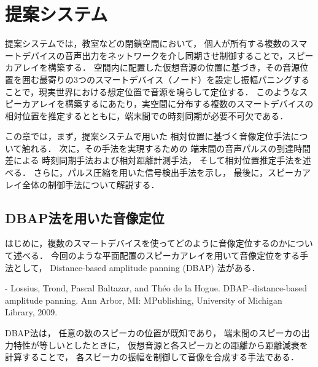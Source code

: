 
\chapter{提案システム}

提案システムでは，教室などの閉鎖空間において，
個人が所有する複数のスマートデバイスの音声出力をネットワークを介し同期させ制御することで，スピーカアレイを構築する．
空間内に配置した仮想音源の位置に基づき，その音源位置を囲む最寄りの3つのスマートデバイス（ノード）を設定し振幅パニングすることで，現実世界における想定位置で音源を鳴らして定位する．
このようなスピーカアレイを構築するにあたり，実空間に分布する複数のスマートデバイスの相対位置を推定するとともに，端末間での時刻同期が必要不可欠である．


この章では，まず，提案システムで用いた
相対位置に基づく音像定位手法について触れる．
次に，その手法を実現するための
端末間の音声パルスの到達時間差による
時刻同期手法および相対距離計測手法，
そして相対位置推定手法を述べる．
さらに，パルス圧縮を用いた信号検出手法を示し，
最後に，スピーカアレイ全体の制御手法について解説する．

\section{DBAP法を用いた音像定位}

はじめに，複数のスマートデバイスを使ってどのように音像定位するのかについて述べる．
今回のような平面配置のスピーカアレイを用いて音像定位をする手法として，
Distance-based amplitude panning (DBAP) 法がある．

- Lossius, Trond, Pascal Baltazar, and Théo de la Hogue. DBAP–distance-based amplitude panning. Ann Arbor, MI: MPublishing, University of Michigan Library, 2009.

DBAP法は，
任意の数のスピーカの位置が既知であり，
端末間のスピーカの出力特性が等しいとしたときに，
仮想音源と各スピーカとの距離から距離減衰を計算することで，
各スピーカの振幅を制御して音像を合成する手法である．

